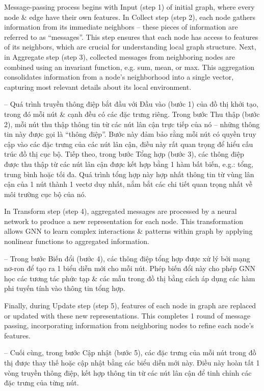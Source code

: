 \documentclass{article}
\begin{document}
\begin{itemize}
\begin{itemize}
\begin{itemize}
            Message-passing process begins with Input (step 1) of initial graph, where every node \& edge have their own features. In Collect step (step 2), each node gathers information from its immediate neighbors -- these pieces of information are referred to as ``messages''. This step ensures that each node has access to features of its neighbors, which are crucial for understanding local graph structure. Next, in Aggregate step (step 3), collected messages from neighboring nodes are combined using an invariant function, e.g. sum, mean, or max. This aggregation consolidates information from a node's neighborhood into a single vector, capturing most relevant details about its local environment.

            -- Quá trình truyền thông điệp bắt đầu với Đầu vào (bước 1) của đồ thị khởi tạo, trong đó mỗi nút \& cạnh đều có các đặc trưng riêng. Trong bước Thu thập (bước 2), mỗi nút thu thập thông tin từ các nút lân cận trực tiếp của nó -- những thông tin này được gọi là ``thông điệp''. Bước này đảm bảo rằng mỗi nút có quyền truy cập vào các đặc trưng của các nút lân cận, điều này rất quan trọng để hiểu cấu trúc đồ thị cục bộ. Tiếp theo, trong bước Tổng hợp (bước 3), các thông điệp được thu thập từ các nút lân cận được kết hợp bằng 1 hàm bất biến, e.g.: tổng, trung bình hoặc tối đa. Quá trình tổng hợp này hợp nhất thông tin từ vùng lân cận của 1 nút thành 1 vectơ duy nhất, nắm bắt các chi tiết quan trọng nhất về môi trường cục bộ của nó.

            In Transform step (step 4), aggregated messages are processed by a neural network to produce a new representation for each node. This transformation allows GNN to learn complex interactions \& patterns within graph by applying nonlinear functions to aggregated information.

            -- Trong bước Biến đổi (bước 4), các thông điệp tổng hợp được xử lý bởi mạng nơ-ron để tạo ra 1 biểu diễn mới cho mỗi nút. Phép biến đổi này cho phép GNN học các tương tác phức tạp \& các mẫu trong đồ thị bằng cách áp dụng các hàm phi tuyến tính vào thông tin tổng hợp.

            Finally, during Update step (step 5), features of each node in graph are replaced or updated with these new representations. This completes 1 round of message passing, incorporating information from neighboring nodes to refine each node's features.

            -- Cuối cùng, trong bước Cập nhật (bước 5), các đặc trưng của mỗi nút trong đồ thị được thay thế hoặc cập nhật bằng các biểu diễn mới này. Điều này hoàn tất 1 vòng truyền thông điệp, kết hợp thông tin từ các nút lân cận để tinh chỉnh các đặc trưng của từng nút.


\end{itemize}
\end{itemize}
\end{itemize}
\end{document}
